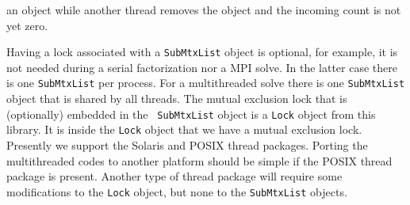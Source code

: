 an object while another thread removes the object and the incoming
count is not yet zero.
\par
Having a lock associated with a {\tt SubMtxList} object is optional,
for example, it is not needed during a serial factorization nor a
MPI solve. 
In the latter case there is one {\tt SubMtxList} per process.
For a multithreaded solve there is one {\tt SubMtxList}
object that is shared by all threads.
The mutual exclusion lock that is (optionally) embedded in the {\tt
SubMtxList} object is a {\tt Lock} object from this library.
It is inside the {\tt Lock} object that we have a
mutual exclusion lock.
Presently we support the Solaris and POSIX thread packages.
Porting the multithreaded codes to another platform should be
simple if the POSIX thread package is present.
Another type of thread package will require some modifications
to the {\tt Lock} object, but none to the {\tt SubMtxList} objects.
\par
